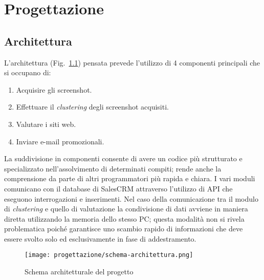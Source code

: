 \chapter{Progettazione}

\label{cap:progettazione}


\section{Architettura}
L'architettura (Fig.~\ref{fig:schema-architettura}) pensata prevede l'utilizzo di 4 componenti principali che si occupano di:
\begin{enumerate}
    \item Acquisire gli screenshot.
    \item Effettuare il \emph{clustering} degli screenshot acquisiti.
    \item Valutare i siti web.
    \item Inviare e-mail promozionali.
\end{enumerate}
La suddivisione in componenti consente di avere un codice più strutturato e specializzato nell'assolvimento di determinati compiti; rende anche la comprensione da parte di altri programmatori più rapida e chiara.
I vari moduli comunicano con il database di SalesCRM attraverso l'utilizzo di \gls{API} che eseguono interrogazioni e inserimenti.
Nel caso della comunicazione tra il modulo di \emph{clustering} e quello di valutazione la condivisione di dati avviene in maniera diretta utilizzando la memoria dello stesso PC; questa modalità non si rivela problematica poiché garantisce uno scambio rapido di informazioni che deve essere svolto solo ed esclusivamente in fase di addestramento.

\begin{figure}[!h] 
    \centering 
    \texttt{[image: progettazione/schema-architettura.png]} 
    \caption{Schema architetturale del progetto}
    \label{fig:schema-architettura}
  \end{figure}


\newpage

